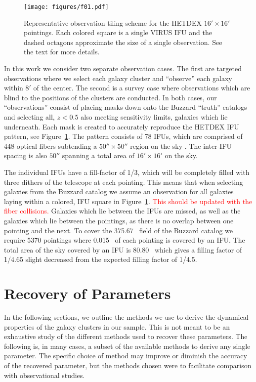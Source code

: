 \documentclass[fleqn,usenatbib]{mnras}
\newcommand{\editorial}[1]{\textcolor{red}{#1}}
\begin{document}
\begin{figure} 
	\texttt{[image: figures/f01.pdf]} 
	\caption{Representative observation tiling scheme for the HETDEX $16' \times 16'$ pointings. Each colored square is a single VIRUS IFU and the dashed octagons approximate the size of a single observation. See the text for more details.} \label{fig: ifu layout} 
\end{figure}

In this work we consider two separate observation cases. The first are targeted observations where we select each galaxy cluster and ``observe'' each galaxy within $8'$ of the center. The second is a survey case where observations which are blind to the positions of the clusters are conducted. In both cases, our ``observations'' consist of placing masks down onto the Buzzard ``truth'' catalogs and selecting all, $z< 0.5$ also meeting sensitivity limits, galaxies which lie underneath. Each mask is created to accurately reproduce the HETDEX IFU pattern, see Figure~\ref{fig: ifu layout}. The pattern consists of 78 IFUs, which are comprised of 448 optical fibers subtending a $50'' \times 50''$ region on the sky \citep{Kelz2014}. The inter-IFU spacing is also $50''$ spanning a total area of $16'\times 16'$ on the sky. 

The individual IFUs have a fill-factor of 1/3, which will be completely filled with three dithers of the telescope at each pointing. This means that when selecting galaxies from the Buzzard catalog we assume an observation for all galaxies laying within a colored, IFU square in Figure~\ref{fig: ifu layout}. \editorial{This should be updated with the fiber collisions.} Galaxies which lie between the IFUs are missed, as well as the galaxies which lie between the pointings, as there is no overlap between one pointing and the next. To cover the 375.67 \degsq\ field of the Buzzard catalog we require 5370 pointings where 0.015 \degsq\ of each pointing is covered by an IFU. The total area of the sky covered by an IFU is 80.80 \degsq\ which gives a filling factor of 1/4.65 slight decreased from the expected filling factor of 1/4.5. 

\section{Recovery of Parameters}\label{sec:recovery}
 In the following sections, we outline the methods we use to derive the dynamical properties of the galaxy clusters in our sample. This is not meant to be an exhaustive study of the different methods used to recover these parameters. The following is, in many cases, a subset of the available methods to derive any single parameter. The specific choice of method may improve or diminish the accuracy of the recovered parameter, but the methods chosen were to facilitate comparison with observational studies. 
\end{document}
